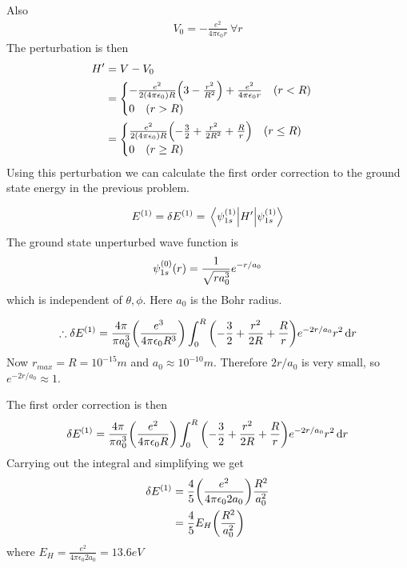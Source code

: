 \begin{enumerate}[label=Problem.\arabic*,start=1]
			Also
			\begin{align*}
				V_0 = - \frac{e^2}{4 \pi \epsilon_0 r} \ \forall r
			\end{align*}
			The perturbation is then
			\begin{align*}
				H^\prime 
				&= V - V_0 \\
				&= \begin{cases}
				- \frac{e^2}{2 \qty(4 \pi \epsilon_0) R} \qty(3 - \frac{r^2}{R^2}) + \frac{e^2}{4 \pi \epsilon_0 r} \quad (r < R) \\ 0 \quad (r > R)
				\end{cases}\\
				&= \begin{cases}
				\frac{e^2}{2 \qty(4 \pi \epsilon_0) R} \qty(-\frac{3}{2} + \frac{r^2}{2 R^2}  + \frac{R}{r}) \quad (r \leq R)
				\\ 0 \quad (r \geq R)
				\end{cases}
			\end{align*}
			Using this perturbation we can calculate the first order correction to the ground state energy in the previous problem.
			
			\begin{align*}
				E^{(1)} = \delta E^{(1)} = \expval{H^\prime}{\psi_{1 s}^{(1)}}
			\end{align*}
			The ground state unperturbed wave function is
			\begin{align*}
				\psi_{1 s}^{(0)}\qty(r) = \frac{1}{\sqrt{r a_0^3}} e^{-r/a_0}
			\end{align*}
			which is independent of $\theta, \phi$. Here $a_0$ is the Bohr radius.
			
			\begin{align*}
				\therefore \delta E^{(1)} = \frac{4 \pi}{\pi a_0^3} \qty(\frac{e^3}{4 \pi \epsilon_0 R^3}) \int_{0}^{R} \qty(-\frac{3}{2} + \frac{r^2}{2 R}  +  \frac{R}{r}) e^{-2 r / a_0} r^2 \dd{r}
			\end{align*}
			Now $r_{max} = R = 10^{-15} m$ and $a_0 \approx 10^{-10} m$. Therefore $2 r  / a_0$ is very small, so $e^{-2 r / a_0} \approx 1$.
			
			The first order correction is then
			\begin{equation*}
				\delta E^{(1)} = \frac{4 \pi}{\pi a_0^3} \qty(\frac{e^2}{4\pi \epsilon_0 R}) \int_{0}^{R} \qty(-\frac{3}{2} + \frac{r^2}{2 R}  +  \frac{R}{r}) e^{-2 r / a_0} r^2 \dd{r}
			\end{equation*}
			Carrying out the integral and simplifying we get
			\begin{align*}
				\delta E^{(1)} 
				&= \frac{4}{5} \qty(\frac{e^2}{4\pi \epsilon_0 2 a_0}) \frac{R^2}{a_0^2} \\
				&= \frac{4}{5} E_H \qty(\frac{R^2}{a_0^2})
			\end{align*}
			where $E_H =\frac{e^2}{4\pi \epsilon_0 2 a_0}= 13.6 eV$
		

\end{enumerate}
